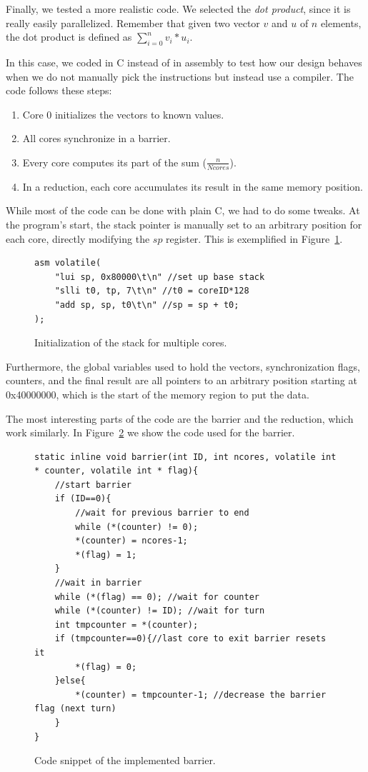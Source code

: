 Finally, we tested a more realistic code.
We selected the \textit{dot product}, since it is really easily parallelized.
Remember that given two vector $v$ and $u$ of $n$ elements, the dot product is defined as $\sum_{i=0}^{n}{v_{i} * u_{i}}$.

In this case, we coded in C instead of in assembly to test how our design behaves when we do not manually pick the instructions but instead use a compiler.
The code follows these steps:
\begin{enumerate}
	\item Core 0 initializes the vectors to known values.
	\item All cores synchronize in a barrier.
	\item Every core computes its part of the sum ($\frac{n}{Ncores}$).
	\item In a reduction, each core accumulates its result in the same memory position.
\end{enumerate}

While most of the code can be done with plain C, we had to do some tweaks.
At the program's start, the stack pointer is manually set to an arbitrary position for each core, directly modifying the $sp$ register.
This is exemplified in Figure~\ref{stackfig}.

\begin{figure}[h!]
    \centering
    \begin{lstlisting}
asm volatile(
	"lui sp, 0x80000\t\n" //set up base stack
	"slli t0, tp, 7\t\n" //t0 = coreID*128
	"add sp, sp, t0\t\n" //sp = sp + t0;
);
    \end{lstlisting}
    \caption{Initialization of the stack for multiple cores.}
    \label{stackfig}
\end{figure}

Furthermore, the global variables used to hold the vectors, synchronization flags, counters, and the final result are all pointers to an arbitrary position starting at 0x40000000, which is the start of the memory region to put the data.

The most interesting parts of the code are the barrier and the reduction, which work similarly.
In Figure~\ref{barrier} we show the code used for the barrier.

\begin{figure}[h!]
    \centering
    \begin{lstlisting}
static inline void barrier(int ID, int ncores, volatile int * counter, volatile int * flag){
	//start barrier
	if (ID==0){
		//wait for previous barrier to end
		while (*(counter) != 0);
		*(counter) = ncores-1;
		*(flag) = 1;
	}
	//wait in barrier
	while (*(flag) == 0); //wait for counter
	while (*(counter) != ID); //wait for turn
	int tmpcounter = *(counter);
	if (tmpcounter==0){//last core to exit barrier resets it
		*(flag) = 0;
	}else{
		*(counter) = tmpcounter-1; //decrease the barrier flag (next turn)
	}
}
    \end{lstlisting}
    \caption{Code snippet of the implemented barrier.}
    \label{barrier}
\end{figure}

